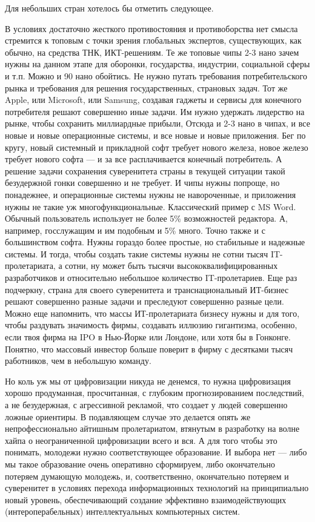 \begin{partbacktext}
Для небольших стран хотелось бы отметить следующее. 

В условиях достаточно жесткого противостояния и противоборства нет смысла стремится к топовым с точки зрения глобальных экспертов, существующих, как обычно,  на средства ТНК, ИКТ-решениям. Те же топовые чипы 2-3 нано зачем нужны на данном этапе для оборонки, государства, индустрии, социальной сферы и т.п. Можно и 90 нано обойтись. Не нужно путать требования потребительского рынка и требования для решения государственных, страновых задач. Тот же Apple,  или Microsoft, или Samsung, создавая гаджеты и сервисы для конечного потребителя решают совершенно иные задачи. Им нужно удержать лидерство на рынке, чтобы сохранить миллиардные прибыли, Отсюда и 2-3 нано в чипах, и все новые и новые операционные системы, и все новые и новые приложения. Бег по кругу, новый системный и прикладной софт  требует нового железа, новое железо требует нового софта --- и за все расплачивается конечный потребитель. А решение задачи сохранения суверенитета страны в текущей ситуации  такой безудержной гонки совершенно и не требует. И чипы нужны попроще, но понадежнее, и операционные системы нужны не навороченные, и приложения нужны не такие уж многофункциональные. Классический пример с MS Word. Обычный пользователь использует не более 5\% возможностей редактора. А, например, госслужащим и им подобным и 5\% много. Точно также и с большинством  софта. Нужны гораздо более простые, но стабильные и надежные системы. И тогда, чтобы создать такие системы нужны не сотни тысяч IT-пролетариата, а сотни, ну может быть тысячи высококвалифицированных разработчиков и относительно небольшое количество IT-пролетариев. Еще раз подчеркну,  страна для своего суверенитета и транснациональный ИТ-бизнес решают совершенно разные задачи и преследуют совершенно разные цели. Можно еще напомнить, что массы ИТ-пролетариата бизнесу нужны  и для того, чтобы раздувать значимость фирмы, создавать иллюзию гигантизма, особенно, если твоя фирма на IPO в Нью-Йорке или Лондоне, или хотя бы в Гонконге. Понятно, что массовый инвестор больше поверит в фирму с десятками тысяч работников, чем в небольшую команду. 

Но коль уж мы от цифровизации никуда не денемся, то нужна цифровизация хорошо продуманная, просчитанная, с глубоким прогнозированием последствий, а не безудержная, с агрессивной рекламой, что создает у людей совершенно ложные ориентиры. В подавляющем случае это делается опять же непрофессионально айтишным пролетариатом, втянутым в разработку на волне хайпа о неограниченной цифровизации всего и вся. А для того чтобы это понимать, молодежи нужно соответствующее образование. И выбора нет --- либо мы такое образование очень оперативно сформируем, либо окончательно потеряем думающую молодежь, и, соответственно, окончательно потеряем и суверенитет в условиях перехода информационных технологий на принципиально новый уровень, обеспечивающий создание эффективно взаимодействующих (интероперабельных) интеллектуальных компьютерных систем.
 

\end{partbacktext}
